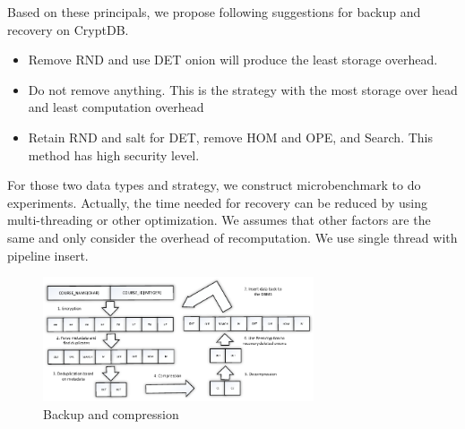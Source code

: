 Based on these principals, we propose following suggestions for backup and recovery on CryptDB. 

\begin{itemize}
\item Remove RND and use DET onion will produce the least storage overhead.
\item Do not remove anything. This is the strategy with the most storage over head and least computation overhead
\item Retain RND and salt for DET, remove HOM and OPE, and Search. This method has high security level.
\end{itemize}

For those two data types and strategy, we construct microbenchmark to do experiments. Actually, the time needed for recovery can be reduced by using multi-threading or other optimization. We assumes that other factors are the same and only consider the overhead of recomputation. We use single thread with pipeline insert.


\begin{figure}[tb]
\centering
\includegraphics[width=8cm]{images/backup_and_recovery.pdf}
\caption{Backup and compression}
\label{fig:stack7}
\end{figure}



